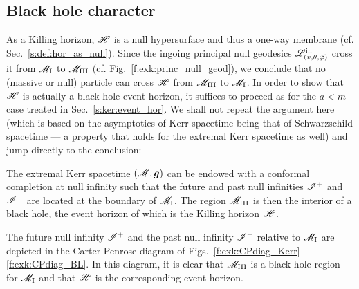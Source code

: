 \subsection{Black hole character} \label{s:exk:bhole_char}

As a Killing horizon, $\mathscr{H}$ is a null hypersurface and thus a one-way membrane
(cf. Sec.~\ref{s:def:hor_as_null}).
Since the ingoing principal null geodesics $\mathscr{L}^{\rm in}_{(v,\theta,{\tilde\varphi})}$
cross it from $\mathscr{M}_{\rm I}$ to $\mathscr{M}_{\rm III}$ (cf. Fig.~\ref{f:exk:princ_null_geod}),
we conclude that no (massive or null) particle can cross $\mathscr{H}$ from $\mathscr{M}_{\rm III}$
to $\mathscr{M}_{\rm I}$.
In order to show that $\mathscr{H}$ is actually a black hole event horizon,
it suffices to proceed as for the $a<m$ case treated in Sec.~\ref{s:ker:event_hor}.
We shall not repeat the argument here (which is based on the
asymptotics of Kerr spacetime being that of Schwarzschild spacetime --- a property
that holds for the extremal Kerr spacetime as well) and jump directly to the conclusion:

\begin{prop}
The extremal Kerr spacetime $(\mathscr{M}, \bm{g})$ can be endowed with a conformal
completion at null infinity such that the future and past null infinities $\mathscr{I}^+$
and $\mathscr{I}^-$ are located at the boundary of $\mathscr{M}_{\rm I}$. The region $\mathscr{M}_{\rm III}$ is
then the interior of a black hole, the event horizon of which is
the Killing horizon $\mathscr{H}$.
\end{prop}

The future null infinity $\mathscr{I}^+$ and the past null infinity $\mathscr{I}^-$
relative to $\mathscr{M}_{\rm I}$ are depicted in the Carter-Penrose diagram of
Figs.~\ref{f:exk:CPdiag_Kerr} -\ref{f:exk:CPdiag_BL}. In this diagram,
it is clear that $\mathscr{M}_{\rm III}$ is a black hole region for $\mathscr{M}_{\rm I}$
and that $\mathscr{H}$ is the corresponding event horizon.

